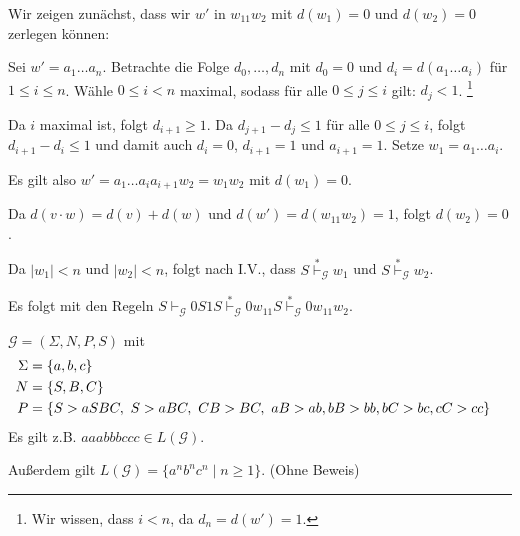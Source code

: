 \begin{Bsp}
\begin{description}[font=\normalfont]
  \medskip

  Wir zeigen zunächst, dass wir $w'$ in $w_11w_2$ mit $d(w_1) = 0$ und $d(w_2) = 0$ zerlegen können:

    Sei $w' = a_1 \ldots a_n$.
    Betrachte die Folge $d_0,\ldots,d_n$ mit $d_0 = 0$ und $d_i = d(a_1\ldots a_i)$ für $1 \le i \leq n$.
    Wähle $0 \le i < n$ maximal, sodass für alle $0 \le j \le i$ gilt: $d_j < 1$.%
    \footnote{Wir wissen, dass $i < n$, da $d_n = d(w') = 1$.}

    Da $i$ maximal ist, folgt $d_{i+1} \ge 1$.
    Da $d_{j+1} - d_j \le 1$ für alle $0 \le j \le i$, folgt $d_{i+1} - d_i \le 1$ und damit auch $d_i = 0$, $d_{i+1} = 1$ und $a_{i+1} = 1$.
    Setze $w_1 = a_1\ldots a_{i}$.

    Es gilt also $w' = a_1\ldots a_{i}a_{i+1}w_2 = w_1w_2$ mit $d(w_1) = 0$.

    Da $d(v \cdot w) = d(v) + d(w)$ und $d(w') = d(w_11w_2) = 1$, folgt $d(w_2) = 0$.
  \bigskip
  \goodbreak

  Da $|w_1| < n$ und $|w_2| < n$, folgt nach I.V., dass $S \stackrel{*}{\vdash}_{\mathcal{G}} w_1$ und $S \stackrel{*}{\vdash}_{\mathcal{G}} w_2$.

  Es folgt mit den Regeln $S \vdash_{\mathcal{G}} 0S1S \stackrel{*}{\vdash}_{\mathcal{G}} 0w_11S \stackrel{*}{\vdash}_{\mathcal{G}} 0w_11w_2$.
  \qedhere
\end{description}
\end{Bsp}

\begin{Bsp}\label{bsp:3.anbncn}
	$\mathcal{G}=(\Sigma,N,P,S)$ mit
	\begin{align*}
		\Sigma &= \{a,b,c\}\\
		N &= \{S,B,C\}\\
		P &= 
		\begin{aligned}[t]
			 \{ &S \-> aSBC,\ S\->aBC,\ CB\-> BC,\ aB\-> ab,
			bB\-> bb, bC\-> bc, cC\-> cc \}
		\end{aligned}
	\end{align*}
Es gilt z.B. $aaabbbccc\in L(\mathcal{G})$.

Außerdem gilt $L(\mathcal{G}) =  \{ a^nb^nc^n \mid n\geq 1 \}$. (Ohne Beweis)
\end{Bsp}

